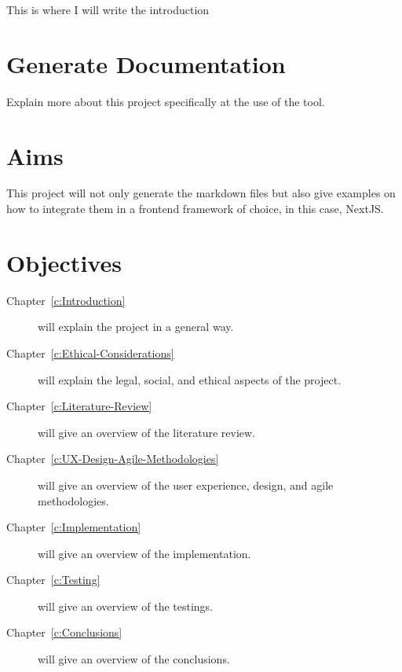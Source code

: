 This is where I will write the introduction

\section{Generate Documentation}
\label{s:Generate-Documentation1}

Explain more about this project specifically at the use of the tool.

\section{Aims}
\label{s:Aim}

This project will not only generate the markdown files but also give examples on how to integrate them in a frontend framework of choice, in this case, NextJS\@.

\section{Objectives}
\label{s:Objectives}

\begin{description}

  \item[Chapter~\ref{c:Introduction}] will explain the project in a general way.

  \item[Chapter~\ref{c:Ethical-Considerations}] will explain the legal, social, and ethical aspects of the project.

  \item[Chapter~\ref{c:Literature-Review}] will give an overview of the literature review.

  \item[Chapter~\ref{c:UX-Design-Agile-Methodologies}] will give an overview of the user experience, design, and agile methodologies.

  \item[Chapter~\ref{c:Implementation}] will give an overview of the implementation.

  \item[Chapter~\ref{c:Testing}] will give an overview of the testings.

  \item[Chapter~\ref{c:Conclusions}] will give an overview of the conclusions.

\end{description}



